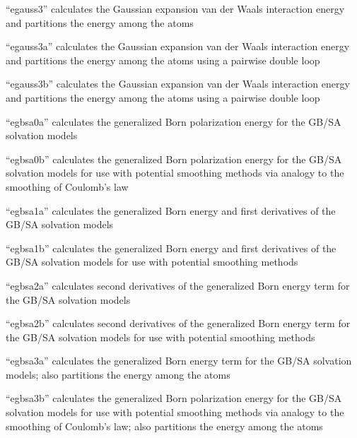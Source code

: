 \documentclass[letterpaper,11pt,english]{sphinxmanual}
\begin{document}
“egauss3” calculates the Gaussian expansion van der Waals interaction energy and partitions the energy among the atoms


“egauss3a” calculates the Gaussian expansion van der Waals interaction energy and partitions the energy among the atoms using a pairwise double loop


“egauss3b” calculates the Gaussian expansion van der Waals interaction energy and partitions the energy among the atoms using a pairwise double loop


“egbsa0a” calculates the generalized Born polarization energy for the GB/SA solvation models


“egbsa0b” calculates the generalized Born polarization energy for the GB/SA solvation models for use with potential smoothing methods via analogy to the smoothing of Coulomb’s law


“egbsa1a” calculates the generalized Born energy and first derivatives of the GB/SA solvation models


“egbsa1b” calculates the generalized Born energy and first derivatives of the GB/SA solvation models for use with potential smoothing methods


“egbsa2a” calculates second derivatives of the generalized Born energy term for the GB/SA solvation models


“egbsa2b” calculates second derivatives of the generalized Born energy term for the GB/SA solvation models for use with potential smoothing methods


“egbsa3a” calculates the generalized Born energy term for the GB/SA solvation models; also partitions the energy among the atoms


“egbsa3b” calculates the generalized Born polarization energy for the GB/SA solvation models for use with potential smoothing methods via analogy to the smoothing of Coulomb’s law; also partitions the energy among the atoms
\end{document}

